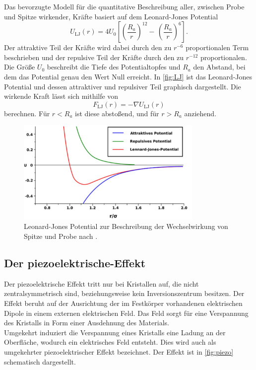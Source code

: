 Das bevorzugte Modell für die quantitative Beschreibung aller, zwischen Probe und Spitze wirkender, Kräfte basiert auf dem Leonard-Jones Potential
\begin{equation}
  U_{\text{LJ}}(r) = 4U_0\left[\left(\frac{R_a}{r}\right)^{12}-\,\left(\frac{R_a}{r}\right)^6\right].
\end{equation}
Der attraktive Teil der Kräfte wird dabei durch den zu $r^{-6}$ proportionalen Term beschrieben und der repulsive Teil der Kräfte durch den zu $r^{-12}$ proportionalen.
Die Größe $U_0$ beschreibt die Tiefe des Potentialtopfes und $R_a$ den Abstand, bei dem das Potential genau den Wert Null erreicht. In \autoref{fig:LJ} ist das Leonard-Jones Potential und dessen attraktiver und repulsiver Teil graphisch dargestellt.
Die wirkende Kraft lässt sich mithilfe von
\begin{equation}
  F_{\text{LJ}}(r) = - \nabla U_{\text{LJ}}(r)
\end{equation}
berechnen. Für $r<R_a$ ist diese abstoßend, und für $r>R_a$ anziehend.
\begin{figure}[H]
  \centering
  \includegraphics[width=0.8\textwidth]{content/plots/LJ.jpg}
  \caption{Leonard-Jones Potential zur Beschreibung der Wechselwirkung von Spitze und Probe nach \cite{afm_datasheet}.}
  \label{fig:LJ}
\end{figure}
\subsection{Der piezoelektrische-Effekt}
Der piezoelektrische Effekt tritt nur bei Kristallen auf, die nicht zentralsymmetrisch sind, beziehungsweise kein Inversionszentrum besitzen. Der Effekt beruht auf der Ausrichtung der im Festkörper vorhandenen elektrischen Dipole in einem externen elektrischen Feld. Das Feld sorgt für eine Verspannung des Kristalls in Form einer Ausdehnung des Materials.\\
Umgekehrt induziert die Verspannung eines Kristalls eine Ladung an der Oberfläche, wodurch ein elektrisches Feld entsteht. Dies wird auch als umgekehrter piezoelektrischer Effekt bezeichnet. Der Effekt ist in \autoref{fig:piezo} schematisch dargestellt.

